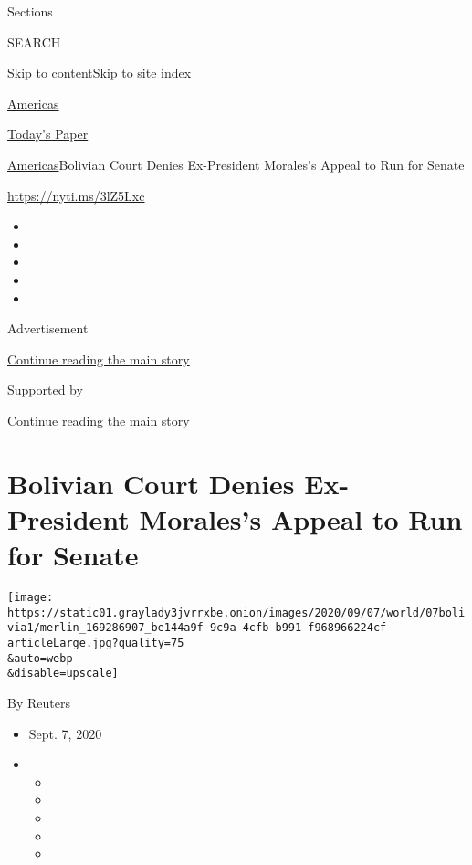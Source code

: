 Sections

SEARCH

\protect\hyperlink{site-content}{Skip to
content}\protect\hyperlink{site-index}{Skip to site index}

\href{https://www.nytimes3xbfgragh.onion/section/world/americas}{Americas}

\href{https://myaccount.nytimes3xbfgragh.onion/auth/login?response_type=cookie\&client_id=vi}{}

\href{https://www.nytimes3xbfgragh.onion/section/todayspaper}{Today's
Paper}

\href{/section/world/americas}{Americas}\textbar{}Bolivian Court Denies
Ex-President Morales's Appeal to Run for Senate

\url{https://nyti.ms/3lZ5Lxc}

\begin{itemize}
\item
\item
\item
\item
\item
\end{itemize}

Advertisement

\protect\hyperlink{after-top}{Continue reading the main story}

Supported by

\protect\hyperlink{after-sponsor}{Continue reading the main story}

\hypertarget{bolivian-court-denies-ex-president-moraless-appeal-to-run-for-senate}{%
\section{Bolivian Court Denies Ex-President Morales's Appeal to Run for
Senate}\label{bolivian-court-denies-ex-president-moraless-appeal-to-run-for-senate}}

\texttt{[image: https://static01.graylady3jvrrxbe.onion/images/2020/09/07/world/07bolivia1/merlin\_169286907\_be144a9f-9c9a-4cfb-b991-f968966224cf-articleLarge.jpg?quality=75\\\&auto=webp\\\&disable=upscale]}

By Reuters

\begin{itemize}
\item
  Sept. 7, 2020
\item
  \begin{itemize}
  \item
  \item
  \item
  \item
  \item
  \end{itemize}
\end{itemize}

